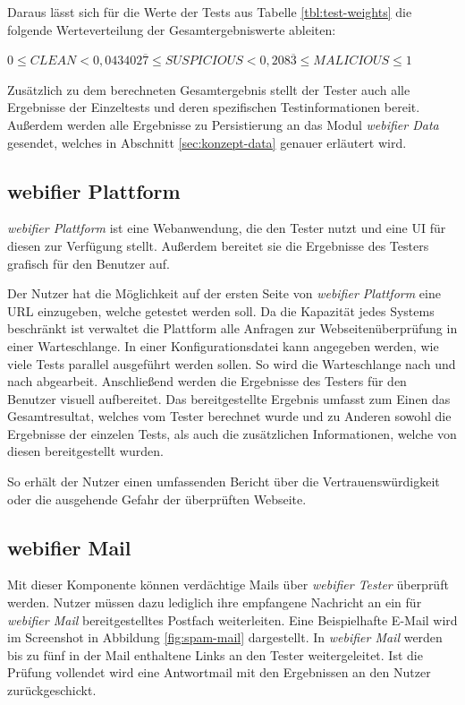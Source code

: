 Daraus lässt sich für die Werte der Tests aus Tabelle \ref{tbl:test-weights} die folgende Werteverteilung der Gesamtergebniswerte ableiten:

\begin{center}
$0 \leq CLEAN < 0,043402\overline{7} \leq SUSPICIOUS < 0,208\overline{3} \leq MALICIOUS \leq 1$
\end{center}

Zusätzlich zu dem berechneten Gesamtergebnis stellt der Tester auch alle Ergebnisse der Einzeltests
und deren spezifischen Testinformationen bereit. Außerdem werden alle Ergebnisse zu Persistierung an
das Modul \textit{webifier Data} gesendet, welches in Abschnitt \ref{sec:konzept-data} genauer erläutert wird.

\subsection{webifier Plattform}

\textit{webifier Plattform} ist eine Webanwendung, die den Tester nutzt und eine \ac{UI} für diesen
zur Verfügung stellt. Außerdem bereitet sie die Ergebnisse des Testers grafisch für den Benutzer auf.

Der Nutzer hat die Möglichkeit auf der ersten Seite von \textit{webifier Plattform} eine \acs{URL}
einzugeben, welche getestet werden soll. Da die Kapazität jedes Systems beschränkt ist verwaltet die
Plattform alle Anfragen zur Webseitenüberprüfung in einer Warteschlange. In einer
Konfigurationsdatei kann angegeben werden, wie viele Tests parallel ausgeführt werden sollen. So
wird die Warteschlange nach und nach abgearbeit. Anschließend werden die Ergebnisse des Testers für
den Benutzer visuell aufbereitet. Das bereitgestellte Ergebnis umfasst zum Einen das Gesamtresultat, welches vom Tester berechnet wurde und zu Anderen sowohl die Ergebnisse der einzelen Tests, als auch die zusätzlichen Informationen, welche von diesen bereitgestellt wurden.

So erhält der Nutzer einen umfassenden Bericht über die Vertrauenswürdigkeit oder die ausgehende Gefahr der überprüften Webseite.

\subsection{webifier Mail}
Mit dieser Komponente können verdächtige Mails über \textit{webifier Tester} überprüft werden.
Nutzer müssen dazu lediglich ihre empfangene Nachricht an ein für \textit{webifier Mail}
bereitgestelltes Postfach weiterleiten. Eine Beispielhafte E-Mail wird im Screenshot in
Abbildung \ref{fig:spam-mail} dargestellt. In \textit{webifier Mail} werden bis zu fünf in der
Mail enthaltene Links an den Tester weitergeleitet. Ist die Prüfung vollendet wird eine Antwortmail
mit den Ergebnissen an den Nutzer zurückgeschickt.

